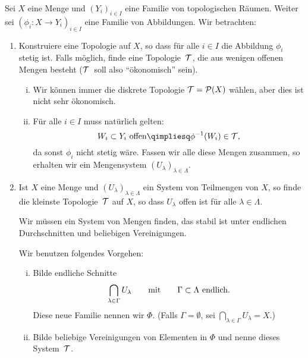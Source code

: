 \begin{thEmpty}[Initialtopologie] \label{vl18:7.19}
    Sei $X$ eine Menge und $(Y_i)_{i\in I}$ eine Familie von topologischen
    Räumen. Weiter sei $(\phi_i\colon X\to Y_i)_{i\in I}$ eine Familie von
    Abbildungen. Wir betrachten:
    \begin{enumerate}[{Problem }1{:},align=left,leftmargin=1cm,itemindent=-0.5cm]
        \item
            Konstruiere eine Topologie auf $X$, so dass für alle $i\in I$
            die Abbildung $\phi_i$ stetig ist.
            Falls möglich, finde eine Topologie~$\operatorname{\mathcal{T}}$, die aus wenigen offenen
            Mengen besteht ($\operatorname{\mathcal{T}}$~soll also \enquote{ökonomisch} sein).
            
            \nnBemerkung \begin{enumerate}[(i)]
                \item
                    Wir können immer die diskrete Topologie $\operatorname{\mathcal{T}}=\operatorname{\mathcal{P}}(X)$
                    wählen, aber dies ist nicht sehr ökonomisch.
                \item
                    Für alle $i\in I$ muss natürlich gelten:
                    \[ W_i\subset Y_i \text{ offen} \qimpliesq
                        \phi^{-1}(W_i) \in \Topo
                    , \]
                    da sonst $\phi_i$ nicht stetig wäre.
                Fassen wir alle diese Mengen zusammen, so erhalten wir ein
                Mengensystem $(U_\lambda)_{\lambda\in\Lambda}$.
            \end{enumerate}
            
        \item
            Ist $X$ eine Menge und $(U_\lambda)_{\lambda\in\Lambda}$ ein System
            von Teilmengen von $X$, so finde die kleinste
            Topologie~$\operatorname{\mathcal{T}}$ auf $X$, so dass $U_\lambda$ offen ist für alle
            $\lambda\in\Lambda$.
            
            Wir müssen ein System von Mengen finden, das
            stabil ist unter endlichen Durchschnitten und beliebigen
            Vereinigungen.
            
            Wir benutzen folgendes Vorgehen:
            \begin{enumerate}[(i)]
                \item
                    Bilde endliche Schnitte
                    \[ \bigcap_{\lambda\in\Gamma} U_\lambda \qquad\text{mit}\qquad
                        \Gamma\subset\Lambda \text{ endlich}
                    . \]
                    Diese neue Familie nennen wir $\Phi$. (Falls
                    $\Gamma=\emptyset$, sei $\bigcap_{\lambda\in\Gamma}
                    U_\lambda = X$.)
                    
                \item \label{vl18:7.19:prob2:ii}
                    Bilde beliebige Vereinigungen von Elementen in $\Phi$
                    und nenne dieses System~$\operatorname{\mathcal{T}}$.
            \end{enumerate}
    \end{enumerate}
\end{thEmpty}

